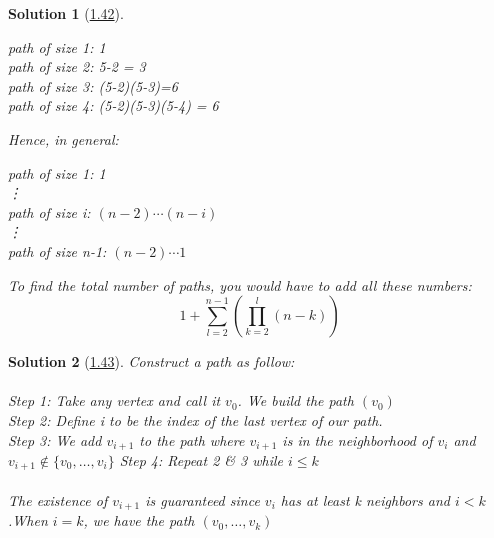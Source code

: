 \documentclass[10pt]{report}
\numberwithin{dummy}{section}
\theoremstyle{ocrenumbox}
\newtheorem{definitionTT}{Solution}[]
\theoremstyle{grayman}
\newenvironment{sol}{\begin{sBox}\begin{definitionTT}}{\end{definitionTT}\end{sBox}}
\begin{document}
\begin{sol}[\hypertarget{so142}{\hyperlink{exo142}{1.42}}]
\begin{minipage}{0.5\textwidth}
\begin{center}
\end{center}
\end{minipage}
\begin{minipage}{0.5\textwidth}
path of size 1: 1 \\
path of size 2: 5-2 = 3 \\
path of size 3: (5-2)(5-3)=6 \\
path of size 4: (5-2)(5-3)(5-4) = 6\\
\end{minipage}
Hence, in general:

\begin{center}
    path of size 1: 1\\
    \phantom{a}\vdots\\
    path of size i: $(n-2)\cdots (n-i)$\\
    \phantom{a}\vdots\\
    path of size n-1: $(n-2)\cdots 1$
\end{center}
To find the total number of paths, you would have to add all these numbers:
\[ 1+ \sum_{l=2}^{n-1} \left( \prod_{k=2}^{l} (n-k)\right) \]
\end{sol}
\begin{sol}[\hypertarget{so143}{\hyperlink{exo143}{1.43}}]
Construct a path as follow:\\\\
Step 1: Take any vertex and call it $v_0$. We build the path $(v_0)$\\
Step 2: Define i to be the index of the last vertex of our path. \\
Step 3: We add $v_{i+1}$ to the path where $v_{i+1}$ is in the neighborhood of $v_i$ and $v_{i+1} \notin \{v_0,\dots,v_i\}$ 
Step 4: Repeat 2 \& 3 while $i \leq k$\\ \\
The existence of $v_{i+1}$ is guaranteed since $v_i$ has at least k neighbors and $i<k$.When $i=k$, we have the path $(v_0,\dots,v_k)$
\end{sol}
\end{document}

